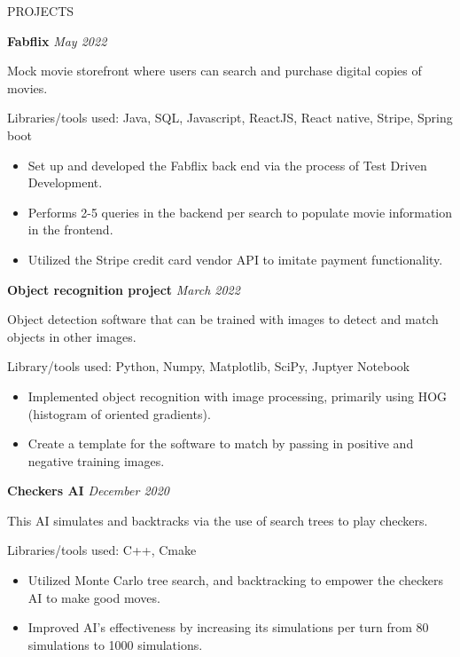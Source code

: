 \documentclass{ResumeFormat} %
\begin{document}
\begin{rSection}{PROJECTS}
\vspace{-1em}

\item \textbf{Fabflix} {} \hfill {\emph{May 2022}} %

Mock movie storefront where users can search and purchase digital copies of movies.

Libraries/tools used: Java, SQL, Javascript, ReactJS, React native, Stripe, Spring boot
\begin{itemize}
    \itemsep -3pt {}
     \item Set up and developed the Fabflix back end via the process of Test Driven Development.
     \item Performs 2-5 queries in the backend per search to populate movie information in the frontend.
     \item Utilized the Stripe credit card vendor API to imitate payment functionality.
 \end{itemize}

 \item \textbf{Object recognition project} {} \hfill {\emph{March 2022}}

Object detection software that can be trained with images to detect and match objects in other images.

Library/tools used: Python, Numpy, Matplotlib, SciPy, Juptyer Notebook
\begin{itemize}
    \itemsep -3pt {} 
     \item Implemented object recognition with image processing, primarily using HOG (histogram of oriented gradients).
     \item Create a template for the software to match by passing in positive and negative training images.
 \end{itemize}

 \item \textbf{Checkers AI} {} \hfill {\emph{December 2020}}

This AI simulates and backtracks via the use of search trees to play checkers.

Libraries/tools used: C++, Cmake
\begin{itemize}
    \itemsep -3pt {}
     \item Utilized Monte Carlo tree search, and backtracking to empower the checkers AI to make good moves.
     \item Improved AI's effectiveness by increasing its simulations per turn from 80 simulations to 1000 simulations.
 \end{itemize}


\end{rSection}
\end{document}
